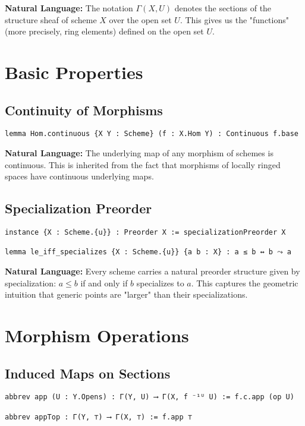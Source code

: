 \documentclass{article}
\theoremstyle{definition}
\begin{document}
\textbf{Natural Language:} The notation $\Gamma(X, U)$ denotes the sections of the structure sheaf of scheme $X$ over the open set $U$. This gives us the "functions" (more precisely, ring elements) defined on the open set $U$.

\section{Basic Properties}

\subsection{Continuity of Morphisms}

\begin{lstlisting}
lemma Hom.continuous {X Y : Scheme} (f : X.Hom Y) : Continuous f.base
\end{lstlisting}

\textbf{Natural Language:} The underlying map of any morphism of schemes is continuous. This is inherited from the fact that morphisms of locally ringed spaces have continuous underlying maps.

\subsection{Specialization Preorder}

\begin{lstlisting}
instance {X : Scheme.{u}} : Preorder X := specializationPreorder X

lemma le_iff_specializes {X : Scheme.{u}} {a b : X} : a ≤ b ↔ b ⤳ a
\end{lstlisting}

\textbf{Natural Language:} Every scheme carries a natural preorder structure given by specialization: $a \leq b$ if and only if $b$ specializes to $a$. This captures the geometric intuition that generic points are "larger" than their specializations.

\section{Morphism Operations}

\subsection{Induced Maps on Sections}

\begin{lstlisting}
abbrev app (U : Y.Opens) : Γ(Y, U) ⟶ Γ(X, f ⁻¹ᵁ U) := f.c.app (op U)

abbrev appTop : Γ(Y, ⊤) ⟶ Γ(X, ⊤) := f.app ⊤
\end{lstlisting}
\end{document}
